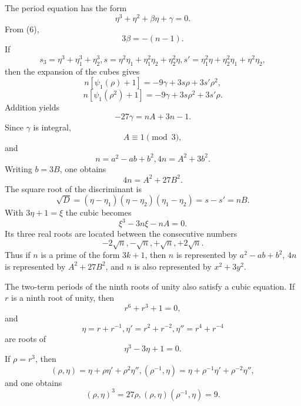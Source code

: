 \documentclass[11pt]{article}
\begin{document}
The period equation has the form
\[
        \eta^3+
\eta^2+
\beta\eta+
\gamma=0.                          \tag{8}
\]
From (6),
\[
        3\beta=-(n-1).                                                   \tag{9}
\]
If
\[
        s_3=\eta^3+
\eta_1^3+
\eta_2^3,
        s=\eta^2\eta_1+
\eta_1^2\eta_2+
\eta_2^2\eta,
        s'=\eta_1^2\eta+
\eta_2^2\eta_1+
\eta^2\eta_2,
\]
then the expansion of the cubes gives
\[
        n[\psi_1(\rho)+1]=-9\gamma+3s\rho+3s'\rho^2,                  \tag{10}
\]
\[
        n[\psi_1(\rho^2)+1]=-9\gamma+3s\rho^2+3s'\rho.                \tag{11}
\]
Addition yields
\[
        -27\gamma=nA+3n-1.                                             \tag{12}
\]
Since $\gamma$ is integral,
\[
        A\equiv1\pmod3,                                                \tag{13}
\]
and
\[
        n=a^2-ab+b^2,
        4n=A^2+3b^2.                                                   \tag{14}
\]
Writing $b=3B$, one obtains
\[
        4n=A^2+27B^2.                                                  \tag{15}
\]
The square root of the discriminant is
\[
        \sqrt D=(\eta-
\eta_1)(\eta-
\eta_2)(\eta_1-
\eta_2)=s-s'=nB.             \tag{16}
\]
With $3\eta+1=\xi$ the cubic becomes
\[
        \xi^3-3n\xi-nA=0.                                              \tag{17}
\]
Its three real roots are located between the consecutive numbers
\[
        -2\sqrt n,
        -\sqrt n,
        +\sqrt n,
        +2\sqrt n.                                                     \tag{18}
\]
Thus if $n$ is a prime of the form $3k+1$, then $n$ is represented by $a^2-ab+b^2$, $4n$ is represented by $A^2+27B^2$, and $n$ is also represented by $x^2+3y^2$.

The two-term periods of the ninth roots of unity also satisfy a cubic equation. If $r$ is a ninth root of unity, then
\[
        r^6+r^3+1=0,                                                    \tag{19}
\]
and
\[
        \eta=r+r^{-1},
        \eta'=r^2+r^{-2},
        \eta''=r^4+r^{-4}                                               \tag{20}
\]
are roots of
\[
        \eta^3-3\eta+1=0.                                                \tag{21}
\]
If $\rho=r^3$, then
\[
        (\rho,
\eta)=\eta+
\rho\eta'+
\rho^2\eta'',
        (\rho^{-1},
\eta)=\eta+
\rho^{-1}\eta'+
\rho^{-2}\eta'',                         \tag{22}
\]
and one obtains
\[
        (\rho,
\eta)^3=27\rho,
        (\rho,
\eta)(\rho^{-1},
\eta)=9.                              \tag{23}
\]
\end{document}
